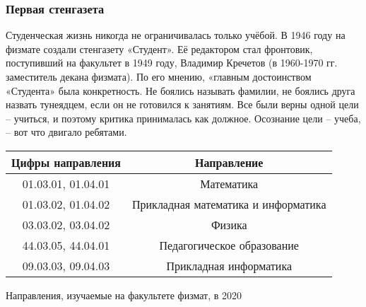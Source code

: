 \documentclass[pdf,hyperref={unicode}, aspectratio=43, serif,11pt]{beamer}
\begin{document}
\begin{frame}
	\frametitle{Первая стенгазета}
	Студенческая жизнь никогда не ограничивалась только учёбой. В 1946 году на физмате создали стенгазету «Студент». Её редактором стал фронтовик, поступивший на факультет в 1949 году, Владимир Кречетов (в 1960-1970 гг. заместитель декана физмата). По его мнению, «главным достоинством «Студента» была конкретность. Не боялись называть фамилии, не боялись друга назвать тунеядцем, если он не готовился к занятиям. Все были верны одной цели – учиться, и поэтому критика принималась как должное. Осознание цели – учеба, – вот что двигало ребятами.
\end{frame}
\begin{frame}
	\begin{table}
		\begin{tabular}{|c|c|}
			\hline

			{\color[HTML]{000000} Цифры направления} & Направление                         \\ \hline
			01.03.01, 01.04.01                       & Математика                          \\ \hline
			01.03.02, 01.04.02                       & Прикладная математика и информатика \\ \hline
			03.03.02, 03.04.02                       & Физика                              \\ \hline
			44.03.05, 44.04.01                       & Педагогическое образование          \\ \hline
			09.03.03, 09.04.03                       & Прикладная информатика              \\ \hline
		\end{tabular}
	\end{table}
	\begin{center}
		Направления, изучаемые на факультете физмат, в 2020
	\end{center}
\end{frame}
\end{document}
